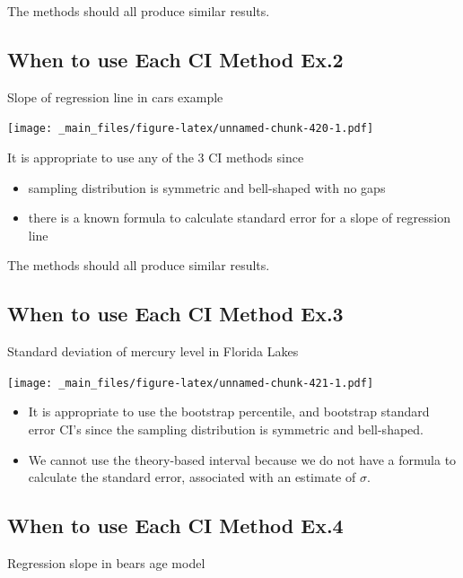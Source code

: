 \documentclass[]{book}
\providecommand{\tightlist}{%
  \setlength{\itemsep}{0pt}\setlength{\parskip}{0pt}}
\begin{document}
The methods should all produce similar results.

\subsection{When to use Each CI Method
Ex.2}\label{when-to-use-each-ci-method-ex.2}

Slope of regression line in cars example

\texttt{[image: \_main\_files/figure-latex/unnamed-chunk-420-1.pdf]}

It is appropriate to use any of the 3 CI methods since

\begin{itemize}
\tightlist
\item
  sampling distribution is symmetric and bell-shaped with no gaps\\
\item
  there is a known formula to calculate standard error for a slope of
  regression line
\end{itemize}

The methods should all produce similar results.

\subsection{When to use Each CI Method
Ex.3}\label{when-to-use-each-ci-method-ex.3}

Standard deviation of mercury level in Florida Lakes

\texttt{[image: \_main\_files/figure-latex/unnamed-chunk-421-1.pdf]}

\begin{itemize}
\tightlist
\item
  It is appropriate to use the bootstrap percentile, and bootstrap
  standard error CI's since the sampling distribution is symmetric and
  bell-shaped.\\
\item
  We cannot use the theory-based interval because we do not have a
  formula to calculate the standard error, associated with an estimate
  of \(\sigma\).
\end{itemize}

\subsection{When to use Each CI Method
Ex.4}\label{when-to-use-each-ci-method-ex.4}

Regression slope in bears age model
\end{document}
